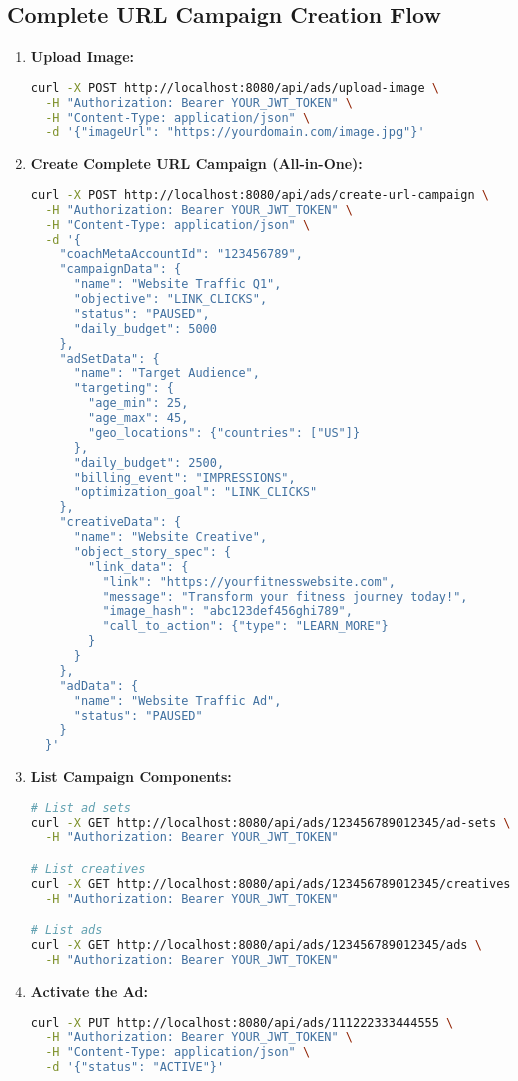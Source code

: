 \documentclass[11pt,a4paper]{article}
\begin{document}
\subsection{Complete URL Campaign Creation Flow}
\begin{enumerate}
  \item \textbf{Upload Image:}
    \begin{lstlisting}[language=bash]
curl -X POST http://localhost:8080/api/ads/upload-image \
  -H "Authorization: Bearer YOUR_JWT_TOKEN" \
  -H "Content-Type: application/json" \
  -d '{"imageUrl": "https://yourdomain.com/image.jpg"}'
    \end{lstlisting}

  \item \textbf{Create Complete URL Campaign (All-in-One):}
    \begin{lstlisting}[language=bash]
curl -X POST http://localhost:8080/api/ads/create-url-campaign \
  -H "Authorization: Bearer YOUR_JWT_TOKEN" \
  -H "Content-Type: application/json" \
  -d '{
    "coachMetaAccountId": "123456789",
    "campaignData": {
      "name": "Website Traffic Q1",
      "objective": "LINK_CLICKS",
      "status": "PAUSED",
      "daily_budget": 5000
    },
    "adSetData": {
      "name": "Target Audience",
      "targeting": {
        "age_min": 25,
        "age_max": 45,
        "geo_locations": {"countries": ["US"]}
      },
      "daily_budget": 2500,
      "billing_event": "IMPRESSIONS",
      "optimization_goal": "LINK_CLICKS"
    },
    "creativeData": {
      "name": "Website Creative",
      "object_story_spec": {
        "link_data": {
          "link": "https://yourfitnesswebsite.com",
          "message": "Transform your fitness journey today!",
          "image_hash": "abc123def456ghi789",
          "call_to_action": {"type": "LEARN_MORE"}
        }
      }
    },
    "adData": {
      "name": "Website Traffic Ad",
      "status": "PAUSED"
    }
  }'
    \end{lstlisting}

  \item \textbf{List Campaign Components:}
    \begin{lstlisting}[language=bash]
# List ad sets
curl -X GET http://localhost:8080/api/ads/123456789012345/ad-sets \
  -H "Authorization: Bearer YOUR_JWT_TOKEN"

# List creatives
curl -X GET http://localhost:8080/api/ads/123456789012345/creatives \
  -H "Authorization: Bearer YOUR_JWT_TOKEN"

# List ads
curl -X GET http://localhost:8080/api/ads/123456789012345/ads \
  -H "Authorization: Bearer YOUR_JWT_TOKEN"
    \end{lstlisting}

  \item \textbf{Activate the Ad:}
    \begin{lstlisting}[language=bash]
curl -X PUT http://localhost:8080/api/ads/111222333444555 \
  -H "Authorization: Bearer YOUR_JWT_TOKEN" \
  -H "Content-Type: application/json" \
  -d '{"status": "ACTIVE"}'
    \end{lstlisting}
\end{enumerate}
\end{document}
